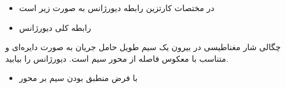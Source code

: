 \begin{ELjoin}

\begin{itemize}
\tightlist
\item
  در مختصات کارتزین رابطه دیورژانس به صورت زیر است
\end{itemize}

\begin{ELimportant}{}


\end{ELimportant}

\end{ELjoin}

\begin{ELjoin}

\begin{itemize}
\tightlist
\item
  رابطه کلی دیورژانس
\end{itemize}

\begin{ELimportant}{}


\end{ELimportant}

\end{ELjoin}


\begin{ELexample}{}

چگالی شار مغناطیسی  در بیرون یک سیم طویل حامل جریان به صورت دایره‌ای و متناسب با معکوس فاصله از محور سیم است. دیورژانس  را بیابید.

\begin{ELsolution}

\begin{itemize}
\tightlist
\item
  با فرض منطبق بودن سیم بر محور 
\end{itemize}



\end{ELsolution}

\end{ELexample}

